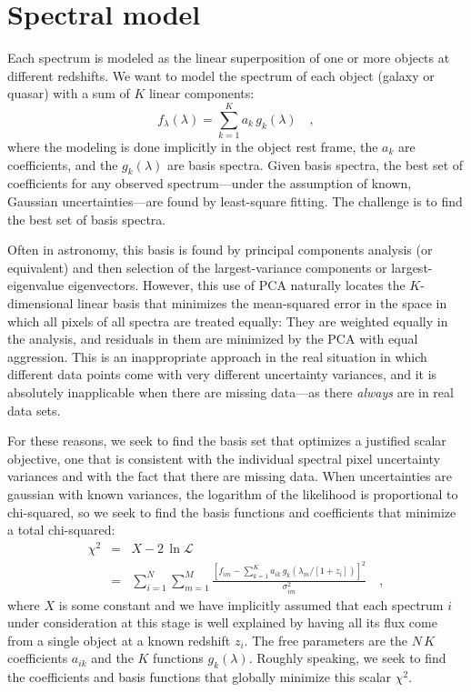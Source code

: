 \documentclass[12pt]{article}
\newcommand{\like}{\mathscr{L}}
\begin{document}
\section{Spectral model}

Each spectrum is modeled as the linear superposition of one or more
objects at different redshifts.  We want to model the spectrum of each
object (galaxy or quasar) with a sum of $K$ linear components:
\begin{equation}
f_{\lambda}(\lambda) = \sum_{k=1}^{K} a_k\,g_k(\lambda)
\quad ,
\end{equation}
where the modeling is done implicitly in the object rest frame, the
$a_k$ are coefficients, and the $g_k(\lambda)$ are basis spectra.
Given basis spectra, the best set of coefficients for any observed
spectrum---under the assumption of known, Gaussian uncertainties---are
found by least-square fitting.  The challenge is to find the
best set of basis spectra.

Often in astronomy, this basis is found by principal components
analysis (or equivalent) and then selection of the largest-variance
components or largest-eigenvalue eigenvectors.  However, this use of
PCA naturally locates the $K$-dimensional linear basis that minimizes
the mean-squared error in the space in which all pixels of all spectra
are treated equally: They are weighted equally in the analysis, and
residuals in them are minimized by the PCA with equal aggression.
This is an inappropriate approach in the real situation in which
different data points come with very different uncertainty variances,
and it is absolutely inapplicable when there are missing data---as
there \emph{always} are in real data sets.

For these reasons, we seek to find the basis set that optimizes a
justified scalar objective, one that is consistent with the individual
spectral pixel uncertainty variances and with the fact that there are
missing data.  When uncertainties are gaussian with known variances,
the logarithm of the likelihood is proportional to chi-squared, so we
seek to find the basis functions and coefficients that minimize a
total chi-squared:
\begin{eqnarray}\displaystyle
\chi^2 & = & X - 2\,\ln\like \nonumber\\
 & = & \sum_{i=1}^N \sum_{m=1}^M
\frac{\left[f_{im}-\sum_{k=1}^K a_{ik}
                      \,g_k(\lambda_m/[1+z_i])\right]^2}
{\sigma^2_{im}}
\quad ,
\end{eqnarray}
where $X$ is some constant and we have implicitly assumed that each
spectrum $i$ under consideration at this stage is well explained by
having all its flux come from a single object at a known redshift
$z_i$.  The free parameters are the $N\,K$ coefficients $a_{ik}$ and
the $K$ functions $g_k(\lambda)$.  Roughly speaking, we seek to find
the coefficients and basis functions that globally minimize this
scalar $\chi^2$.
\end{document}
